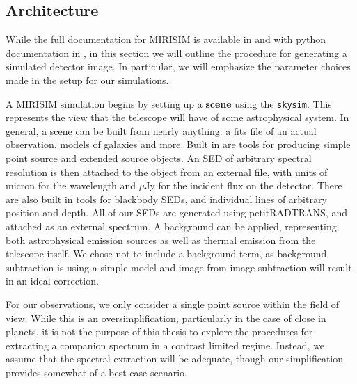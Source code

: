 \subsection{Architecture}
While the full documentation for MIRISIM is available in \parencite{ref:mirisimdocs} and with python documentation in \parencite{Cossou2018}, in this section we will outline the procedure for generating a simulated detector image.
In particular, we will emphasize the parameter choices made in the setup for our simulations.

A MIRISIM simulation begins by setting up a \textbf{scene} using the \verb|skysim|. 
This represents the view that the telescope will have of some astrophysical system.
In general, a scene can be built from nearly anything: a fits file of an actual observation, models of galaxies and more. 
Built in are tools for producing simple point source and extended source objects.
An SED of arbitrary spectral resolution is then attached to the object from an external file, with units of micron for the wavelength and $\mu$Jy for the incident flux on the detector.
There are also built in tools for blackbody SEDs, and individual lines of arbitrary position and depth.
All of our SEDs are generated using petitRADTRANS, and attached as an external spectrum.
A background can be applied, representing both astrophysical emission sources as well as thermal emission from the telescope itself.
We chose not to include a background term, as background subtraction is using a simple model and image-from-image subtraction will result in an ideal correction.

For our observations, we only consider a single point source within the field of view.
While this is an oversimplification, particularly in the case of close in planets, it is not the purpose of this thesis to explore the procedures for extracting a companion spectrum in a contrast limited regime.
Instead, we assume that the spectral extraction will be adequate, though our simplification provides somewhat of a best case scenario.

